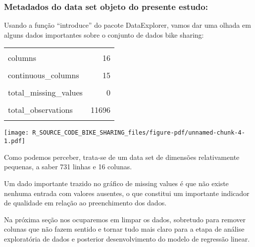 \documentclass[
  letterpaper,
  DIV=11,
  numbers=noendperiod]{scrartcl}
\begin{document}
\newpage{}

\subsubsection{Metadados do data set objeto do presente
estudo:}\label{metadados-do-data-set-objeto-do-presente-estudo}

Usando a função ``introduce'' do pacote DataExplorer, vamos dar uma
olhada em alguns dados importantes sobre o conjunto de dados bike
sharing:

\begin{table}[!h]
\centering\begingroup\fontsize{8}{10}\selectfont

\begin{tabular}{lr}
\toprule
\cellcolor{gray!15}{rows} & \cellcolor{gray!15}{731}\\
columns & 16\\
\cellcolor{gray!15}{discrete\_columns} & \cellcolor{gray!15}{1}\\
continuous\_columns & 15\\
\cellcolor{gray!15}{all\_missing\_columns} & \cellcolor{gray!15}{0}\\
\addlinespace
total\_missing\_values & 0\\
\cellcolor{gray!15}{complete\_rows} & \cellcolor{gray!15}{731}\\
total\_observations & 11696\\
\cellcolor{gray!15}{memory\_usage} & \cellcolor{gray!15}{112208}\\
\bottomrule
\end{tabular}
\endgroup{}
\end{table}

\begin{center}
\texttt{[image: R\_SOURCE\_CODE\_BIKE\_SHARING\_files/figure-pdf/unnamed-chunk-4-1.pdf]}
\end{center}

Como podemos perceber, trata-se de um data set de dimensões
relativamente pequenas, a saber 731 linhas e 16 colunas.

Um dado importante trazido no gráfico de missing values é que não existe
nenhuma entrada com valores ausentes, o que constitui um importante
indicador de qualidade em relação ao preenchimento dos dados.

Na próxima seção nos ocuparemos em limpar os dados, sobretudo para
remover colunas que não fazem sentido e tornar tudo mais claro para a
etapa de análise exploratória de dados e posterior desenvolvimento do
modelo de regressão linear.
\end{document}

